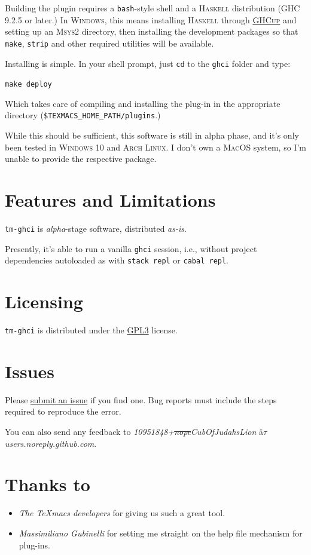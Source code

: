 \documentclass{article}
\renewcommand{\emph}[1]{\textit{#1}}
\begin{document}
Building the plugin requires a \texttt{bash}-style shell and a
{\textsc{Haskell}} distribution ({\textsc{GHC}} 9.2.5 or later.) In
{\textsc{Windows}}, this means installing {\textsc{Haskell}} through
{\textsc{\href{https://www.haskell.org/ghcup/}{GHCup}}} and setting up an
{\textsc{Msys2}} directory, then installing the development packages so that
\texttt{make}, \texttt{strip} and other required utilities will be
available.

Installing is simple. In your shell prompt, just \texttt{cd} to
the \texttt{ghci} folder and type:

\texttt{make deploy}

Which takes care of compiling and installing the plug-in in the appropriate
directory (\texttt{\$TEXMACS\_HOME\_PATH/plugins}.)

While this should be sufficient, this software is still in alpha phase, and
it's only been tested in {\textsc{Windows}} 10 and {\textsc{Arch Linux}}. I
don't own a {\textsc{MacOS}} system, so I'm unable to provide the respective
package.

\section{Features and Limitations}

\texttt{tm-ghci} is {\emph{alpha}}-stage software, distributed
{\emph{as-is}}.

Presently, it's able to run a vanilla \texttt{ghci} session, i.e., without
project dependencies autoloaded as with \texttt{stack repl} or
\texttt{cabal repl}.

\section{Licensing}

\texttt{tm-ghci} is distributed under the
\href{https://www.gnu.org/licenses/gpl-3.0.en.html}{\textsc{GPL3}}
license.

\section{Issues}

Please \href{https://github.com/CubOfJudahsLion/tm-ghci/issues}{submit an
issue} if you find one. Bug reports must include the steps required to
reproduce the error.

You can also send any feedback to
\emph{10951848+\sout{nope}CubOfJudahsLion} {\"a}{$\tau$}
\emph{users.noreply.github.com}.

\section{Thanks to}

\begin{itemize}
  \item {\emph{The TeXmacs developers}} for giving us such a great tool.
  \item {\emph{Massimiliano Gubinelli}} for setting me straight on the help
  file mechanism for plug-ins.
\end{itemize}
\end{document}
